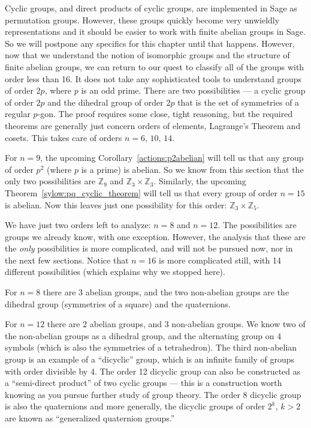 Cyclic groups, and direct products of cyclic groups, are implemented in Sage as permutation groups.  However, these groups quickly become very unwieldly representations and it should be easier to work with finite abelian groups in Sage.  So we will postpone any specifics for this chapter until that happens.  However, now that we understand the notion of isomorphic groups and the structure of finite abelian groups, we can return to our quest to classify all of the groups with order less than 16.
%
%
It does not take any sophisticated tools to understand groups of order $2p$, where $p$ is an odd prime.  There are two possibilities --- a cyclic group of order $2p$ and the dihedral group of order $2p$ that is the set of symmetries of a regular $p$-gon.  The proof requires some close, tight reasoning, but the required theorems are generally just concern orders of elements, Lagrange's Theorem and cosets.  This takes care of orders $n=6,\,10,\,14$.\par
%
For $n=9$, the upcoming Corollary~\ref{actions:p2abelian} will tell us that any group of order $p^2$ (where $p$ is a prime) is abelian.  So we know from this section that the only two possibilities are ${\mathbb Z}_9$ and ${\mathbb Z}_3\times{\mathbb Z}_3$.  Similarly, the upcoming Theorem~\ref{sylow:pq_cyclic_theorem} will tell us that every group of order $n=15$ is abelian.  Now this leaves just one possibility for this order: ${\mathbb Z}_3\times{\mathbb Z}_5$.\par
%
We have just two orders left to analyze:  $n=8$ and $n=12$.  The possibilities are groups we already know, with one exception.  However, the analysis that these are the \emph{only} possibilities is more complicated, and will not be pursued now, nor in the next few sections.  Notice that $n=16$ is more complicated still, with 14 different possibilities (which explains why we stopped here).\par
%
For $n=8$ there are 3 abelian groups, and the two non-abelian groups are the dihedral group (symmetries of a square) and the quaternions.\par
%
For $n=12$ there are 2 abelian groups, and 3 non-abelian groups.  We know two of the non-abelian groups as a dihedral group, and the alternating group on 4 symbols (which is also the symmetries of a tetrahedron).  The third non-abelian group is an example of a ``dicyclic'' group, which is an infinite family of groups with order divisible by 4.  The order 12 dicyclic group can also be constructed as a ``semi-direct product'' of two cyclic groups --- this is a construction worth knowing as you pursue further study of group theory.  The order 8 dicyclic group is also the quaternions and more generally, the dicyclic groups of order $2^k$, $k>2$ are known as ``generalized quaternion groups.''\par
